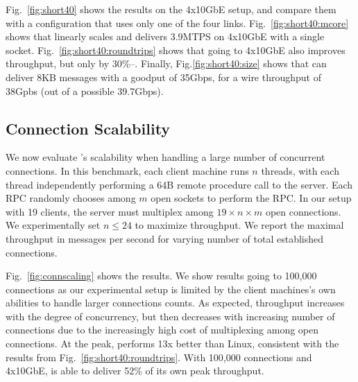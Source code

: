 Fig.~\ref{fig:short40} shows the results on the 4x10GbE setup, and
compare them with a configuration that uses only one of the four
links. Fig.~\ref{fig:short40:mcore} shows that \ix
linearly scales and delivers 3.9MTPS on 4x10GbE with a single socket.
Fig.~\ref{fig:short40:roundtrips} shows that going to 4x10GbE also
improves throughput, but only by 30\%--.  Finally,
Fig.\ref{fig:short40:size} shows that \ix can deliver 8KB messages
with a goodput of 35Gbps, for a wire throughput of 38Gpbs (out of a
possible 39.7Gbps).


\subsection{Connection Scalability}

\label{sec:eval:scale}

We now evaluate \ix's scalability when handling a large number of
concurrent connections. In this benchmark, each client machine runs
$n$ threads, with each thread independently performing a 64B remote
procedure call to the server.  Each RPC randomly chooses among $m$
open sockets to perform the RPC.  In our setup with 19 clients, the
server must multiplex among $19 \times n \times m$ open connections.
We experimentally set $n \leq 24$ to maximize throughput.  We report
the maximal throughput in messages per second for varying number of
total established connections. 


Fig.~\ref{fig:connscaling} shows the results.  We show results going
to 100,000 connections as our experimental setup is limited by the
client machines's own abilities to handle larger connections counts.
As expected, throughput increases with the degree of concurrency, but
then decreases with increasing number of connections due to the
increasingly high cost of multiplexing among open connections.  At the
peak, \ix performs 13x better than Linux, consistent with the results
from Fig.~\ref{fig:short40:roundtrips}.  With 100,000 connections and
4x10GbE, \ix is able to deliver 52\% of its own peak throughput.


